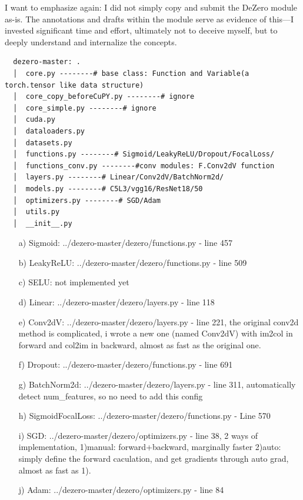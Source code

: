 \documentclass{article}
\begin{document}
I want to emphasize again: I did not simply copy and submit the DeZero module as-is. The annotations and drafts within the module serve as evidence of this—I invested significant time and effort, ultimately not to deceive myself, but to deeply understand and internalize the concepts.

\begin{verbatim}
  dezero-master: .
  │  core.py --------# base class: Function and Variable(a torch.tensor like data structure)
  │  core_copy_beforeCuPY.py --------# ignore 
  │  core_simple.py --------# ignore
  │  cuda.py
  │  dataloaders.py
  │  datasets.py
  │  functions.py --------# Sigmoid/LeakyReLU/Dropout/FocalLoss/
  │  functions_conv.py --------#conv modules: F.Conv2dV function
  │  layers.py --------# Linear/Conv2dV/BatchNorm2d/
  │  models.py --------# C5L3/vgg16/ResNet18/50
  │  optimizers.py --------# SGD/Adam
  │  utils.py
  │  __init__.py
\end{verbatim}

\begin{itemize}
  \item[a)] Sigmoid: ../dezero-master/dezero/functions.py - line 457
  \item[b)] LeakyReLU: ../dezero-master/dezero/functions.py - line 509
  \item[c)] SELU: not implemented yet
  \item[d)] Linear: ../dezero-master/dezero/layers.py - line 118
  \item[e)] Conv2dV: ../dezero-master/dezero/layers.py - line 221, the original conv2d method is complicated, i wrote a new one (named Conv2dV) with im2col in forward and col2im in backward, almost as fast as the original one.
  \item[f)] Dropout: ../dezero-master/dezero/functions.py - line 691
  \item[g)] BatchNorm2d: ../dezero-master/dezero/layers.py - line 311, automatically detect num\_features, so no need to add this config
  \item[h)] SigmoidFocalLoss: ../dezero-master/dezero/functions.py - Line 570
  \item[i)] SGD: ../dezero-master/dezero/optimizers.py - line 38, 2 ways of implementation, 1)manual: forward+backward, marginally faster 2)auto: simply define the forward caculation, and get gradients through auto grad, almost as fast as 1).
  \item[j)] Adam: ../dezero-master/dezero/optimizers.py - line 84   
\end{itemize}
\end{document}

